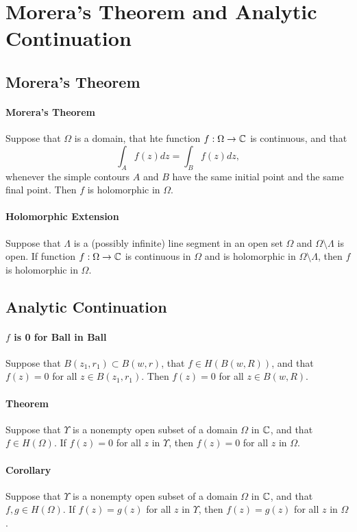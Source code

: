 \section{Morera's Theorem and Analytic Continuation}

\subsection{Morera's Theorem}
\paragraph{Morera's Theorem}
Suppose that \(\Omega\) is a domain, that hte function \(f: \Omega \to \mathbb{C}\) is continuous, and that
\[\int_A f(z) dz = \int_B f(z) dz,\]
whenever the simple contours \(A\) and \(B\) have the same initial point and the same final point. Then \(f\) is holomorphic in \(\Omega\).

\paragraph{Holomorphic Extension}
Suppose that \(\Lambda\) is a (possibly infinite) line segment in an open set \(\Omega\) and \(\Omega \setminus \Lambda\) is open. If function \(f: \Omega \to \mathbb{C}\) is continuous in \(\Omega\) and is holomorphic in \(\Omega \setminus \Lambda\), then \(f\) is holomorphic in \(\Omega\).

\subsection{Analytic Continuation}
\paragraph{\(f\) is 0 for Ball in Ball}
Suppose that \(B(z_1, r_1) \subset B(w, r)\), that \(f \in H(B(w, R))\), and that \(f(z) = 0\) for all \(z \in B(z_1, r_1)\). Then \(f(z) = 0\) for all \(z \in B(w, R)\).

\paragraph{Theorem}
Suppose that \(\Upsilon\) is a nonempty open subset of a domain \(\Omega\) in \(\mathbb{C}\), and that \(f \in H(\Omega)\). If \(f(z) = 0\) for all \(z\) in \(\Upsilon\), then \(f(z) = 0\) for all \(z\) in \(\Omega\).

\paragraph{Corollary}
Suppose that \(\Upsilon\) is a nonempty open subset of a domain \(\Omega\) in \(\mathbb{C}\), and that \(f, g \in H(\Omega)\). If \(f(z) = g(z)\) for all \(z\) in \(\Upsilon\), then \(f(z) = g(z)\) for all \(z\) in \(\Omega\).